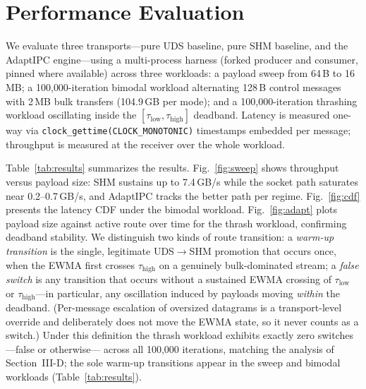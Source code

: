 \documentclass[conference]{IEEEtran}
\newcommand{\taulow}{\tau_{\mathrm{low}}}
\newcommand{\tauhigh}{\tau_{\mathrm{high}}}
\begin{document}
\section{Performance Evaluation}
We evaluate three transports---pure UDS baseline, pure SHM baseline, and the
AdaptIPC engine---using a multi-process harness (forked producer and consumer,
pinned where available) across three workloads: a payload sweep from 64\,B to
16\,MB; a 100{,}000-iteration bimodal workload alternating 128\,B control
messages with 2\,MB bulk transfers (104.9\,GB per mode); and a 100{,}000-iteration
thrashing workload oscillating inside the $[\taulow, \tauhigh]$ deadband.
Latency is measured one-way via \texttt{clock\_gettime(CLOCK\_MONOTONIC)}
timestamps embedded per message; throughput is measured at the receiver over
the whole workload.

Table~\ref{tab:results} summarizes the results. Fig.~\ref{fig:sweep} shows
throughput versus payload size: SHM sustains up to 7.4\,GB/s while the socket
path saturates near 0.2--0.7\,GB/s, and AdaptIPC tracks the better path per
regime. Fig.~\ref{fig:cdf} presents the latency CDF under the bimodal
workload. Fig.~\ref{fig:adapt} plots payload size against active route over
time for the thrash workload, confirming deadband stability. We distinguish
two kinds of route transition: a \emph{warm-up transition} is the single,
legitimate UDS$\rightarrow$SHM promotion that occurs once, when the EWMA
first crosses $\tauhigh$ on a genuinely bulk-dominated stream; a
\emph{false switch} is any transition that occurs without a sustained EWMA
crossing of $\taulow$ or $\tauhigh$---in particular, any oscillation induced
by payloads moving \emph{within} the deadband. (Per-message escalation of
oversized datagrams is a transport-level override and deliberately does not
move the EWMA state, so it never counts as a switch.) Under this definition
the thrash workload exhibits exactly zero switches---false or otherwise---
across all 100{,}000 iterations, matching the analysis of Section~III-D;
the sole warm-up transitions appear in the sweep and bimodal workloads
(Table~\ref{tab:results}).
\end{document}
